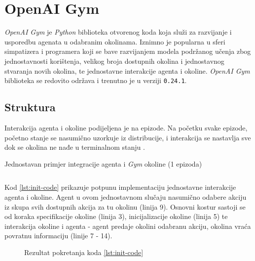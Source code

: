 \chapter{OpenAI Gym}

\textit{OpenAI Gym} je \textit{Python} biblioteka  otvorenog koda  koja služi za razvijanje i usporedbu agenata u odabranim okolinama. Iznimno je popularna u sferi simpatizera i programera koji se bave razvijanjem modela podržanog učenja zbog jednostavnosti korištenja, velikog broja dostupnih okolina i jednostavnog stvaranja novih okolina, te jednostavne interakcije agenta i okoline. \textit{OpenAI Gym} biblioteka se redovito održava i trenutno je u verziji \texttt{0.24.1}. 

\section{Struktura}

Interakcija agenta i okoline podijeljena je na epizode. Na početku svake epizode, početno stanje se nasumično uzorkuje iz distribucije, i interakcija se nastavlja sve dok se okolina ne nađe u terminalnom stanju \cite{OpenAIWhitepaper}.

\begin{listing}[H]
    \caption{Jednostavan primjer integracije agenta i \textit{Gym} okoline (1 epizoda)}
    \inputminted{python}{snippets/init.py}
    \label{lst:init-code}
\end{listing}

Kod \ref{lst:init-code} prikazuje potpunu implementaciju jednostavne interakcije agenta i okoline. Agent u ovom jednostavnom slučaju nasumično odabere akciju iz skupa svih dostupnih akcija za tu okolinu (linija 9). Osnovni kostur sastoji se od koraka specifikacije okoline (linija 3), inicijalizacije okoline (linija 5) te interakcija okoline i agenta - agent predaje okolini odabranu akciju, okolina vraća povratnu informaciju (linije 7 - 14). 

\begin{figure}[h]
    \centering
    \caption{Rezultat pokretanja koda \ref{lst:init-code}}
    \label{fig:mountain-car}
\end{figure}

